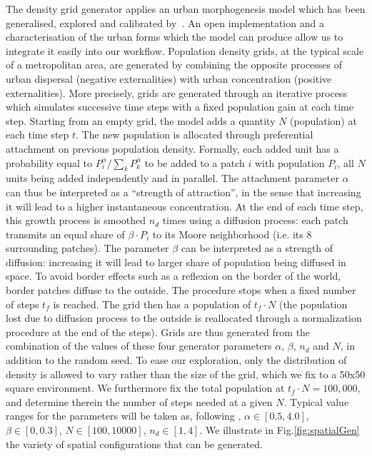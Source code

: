 \documentclass{JASSS}
\begin{document}
The density grid generator applies an urban morphogenesis model \citep{batty2007cities} which has been generalised, explored and calibrated by~\citet{raimbault2018calibration}. An open implementation and a characterisation of the urban forms which the model can produce allow us to integrate it easily into our workflow. Population density grids, at the typical scale of a metropolitan area, are generated by combining the opposite processes of urban dispersal (negative externalities) with urban concentration (positive externalities). More precisely, grids are generated through an iterative process which simulates successive time steps with a fixed population gain at each time step. Starting from an empty grid, the model adds a quantity $N$ (population) at each time step $t$. The new population is allocated through preferential attachment on previous population density. Formally, each added unit has a probability equal to $P_i^{\alpha}/\sum_k P_k^{\alpha}$ to be added to a patch $i$ with population $P_i$, all $N$ units being added independently and in parallel. The attachment parameter $\alpha$ can thus be interpreted as a ``strength of attraction'', in the sense that increasing it will lead to a higher instantaneous concentration. At the end of each time step, this growth process is smoothed $n_d$ times using a diffusion process: each patch transmits an equal share of $\beta\cdot P_i$ to its Moore neighborhood (i.e. its 8 surrounding patches). The parameter $\beta$ can be interpreted as a strength of diffusion: increasing it will lead to larger share of population being diffused in space. To avoid border effects such as a reflexion on the border of the world, border patches diffuse to the outside. The procedure stops when a fixed number of steps $t_f$ is reached. The grid then has a population of $t_f \cdot N$ (the population lost due to diffusion process to the outside is reallocated through a normalization procedure at the end of the steps). Grids are thus generated from the combination of the values of these four generator parameters $\alpha$, $\beta$, $n_d$ and $N$, in addition to the random seed. To ease our exploration, only the distribution of density is allowed to vary rather than the size of the grid, which we fix to a 50x50 square environment. We furthermore fix the total population at $t_f\cdot N = 100,000$, and determine therein the number of steps needed at a given $N$. Typical value ranges for the  parameters will be taken as, following \citet{raimbault2018calibration}, $\alpha\in\left[0.5,4.0\right]$, $\beta \in\left[0,0.3\right] $, $N\in \left[100,10000\right]$, $n_d\in\left[1,4\right]$. We illustrate in Fig.\ref{fig:spatialGen} the variety of spatial configurations that can be generated.
\end{document}
